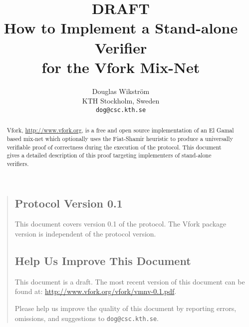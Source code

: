 \documentclass[11pt]{article}
\title{{\Huge DRAFT}\\$\quad$\\How to Implement a Stand-alone Verifier \\for the Vfork Mix-Net}
\author{Douglas Wikstr{\"o}m\\
KTH Stockholm, Sweden\\
\texttt{dog@csc.kth.se}}
\begin{document}


\maketitle

\thispagestyle{empty}

\begin{abstract}

  Vfork, \url{http://www.vfork.org}, is a free and open
  source implementation of an El Gamal based mix-net which optionally
  uses the Fiat-Shamir heuristic to produce a universally verifiable
  proof of correctness during the execution of the protocol. This
  document gives a detailed description of this proof targeting
  implementers of stand-alone verifiers.

\end{abstract}

\begin{quote}

\subsection*{Protocol Version 0.1}

This document covers version 0.1 of the protocol. The Vfork
package version is independent of the protocol version.


\vfill

\subsection*{Help Us Improve This Document}

This document is a draft. The most recent version of this
document can be found at:
\url{http://www.vfork.org/vfork/vmnv-0.1.pdf}.

Please help us improve the quality of this document by reporting
errors, omissions, and suggestions to
\texttt{dog@csc.kth.se}.


\end{quote}

\newpage

\begin{spacing}{0.9}

  \tableofcontents

\end{spacing}

\clearpage

\pagestyle{plain}
\setcounter{page}{1}
\end{document}
